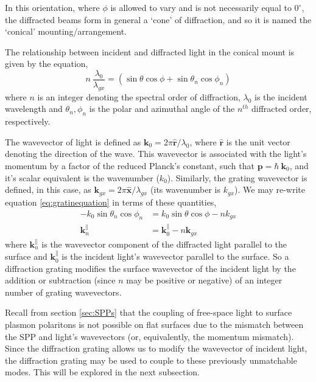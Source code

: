 In this orientation, where $\phi$ is allowed to vary and is not necessarily equal to $0^\circ$, the diffracted beams form in general a `cone' of diffraction, and so it is named the `conical' mounting/arrangement.
 
The relationship between incident and diffracted light in the conical mount is given by the equation,
\begin{equation}
n\:\frac{\lambda_0}{\lambda_{gx}}=(\sin{\theta}\cos{\phi}+\sin{\theta_n}\cos{\phi_n})\label{eq:gratinequation}
\end{equation}
where $n$ is an integer denoting the spectral order of diffraction, $\lambda_0$ is the incident wavelength and $\theta_n, \phi_n$ is the polar and azimuthal angle of the $n^{th}$ diffracted order, respectively.

The wavevector of light is defined as $\mathbf{k}_0=2\pi\hat{\mathbf{r}}/\lambda_0$, where $\hat{\mathbf{r}}$ is the unit vector denoting the direction of the wave. This wavevector is associated with the light's momentum by a factor of the reduced Planck's constant, such that $\mathbf{p}=\hbar\:\mathbf{k}_0$, and it's scalar equivalent is the wavenumber ($k_0$). Similarly, the grating wavevector is defined, in this case, as $\mathbf{k}_{gx}=2\pi\hat{\mathbf{x}}/\lambda_{gx}$ (its wavenumber is $k_{gx}$). We may re-write equation \ref{eq:gratinequation} in terms of these quantities,
\begin{align}
-k_0\sin{\theta_n}\cos{\phi_n}&=k_0 \sin{\theta}\cos{\phi}-n k_{gx}\\
\mathbf{k}_n^\parallel&=\mathbf{k}_0^\parallel-n \mathbf{k}_{gx}\label{eq:addgratinvector}
\end{align}
where $\mathbf{k}_n^\parallel$ is the wavevector component of the diffracted light parallel to the surface and $\mathbf{k}_0^\parallel$ is the incident light's wavevector parallel to the surface.
So a diffraction grating modifies the surface wavevector of the incident light  by the addition or subtraction (since $n$ may be positive or negative) of an integer number of grating wavevectors. 

Recall from section \ref{sec:SPPs} that the coupling of free-space light to surface plasmon polaritons is not possible on flat surfaces due to the mismatch between the SPP and light's wavevectors (or, equivalently, the momentum mismatch). Since the diffraction grating allows us to modify the wavevector of incident light, the diffraction grating may be used to couple to these previously unmatchable modes. This will be explored in the next subsection.

